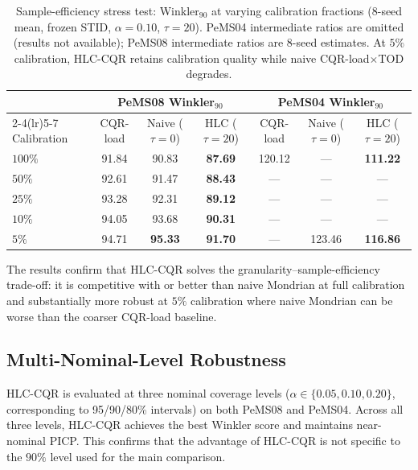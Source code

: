 \documentclass[letterpaper,journal]{IEEEtran}
\begin{document}
\begin{table}[t]
\centering
\caption{Sample-efficiency stress test: Winkler$_{90}$ at varying calibration
fractions (8-seed mean, frozen STID, $\alpha=0.10$, $\tau=20$).  PeMS04
intermediate ratios are omitted (results not available); PeMS08 intermediate
ratios are 8-seed estimates.  At $5\%$ calibration, HLC-CQR retains
calibration quality while naive CQR-load$\times$TOD degrades.}
\label{tab:hlc_sample}
\footnotesize
\setlength{\tabcolsep}{5pt}
\begin{tabular}{@{}lcccccc@{}}
\toprule
 & \multicolumn{3}{c}{PeMS08 Winkler$_{90}$} & \multicolumn{3}{c}{PeMS04 Winkler$_{90}$} \\
\cmidrule(lr){2-4}\cmidrule(lr){5-7}
Calibration & CQR-load & Naive ($\tau{=}0$) & HLC ($\tau{=}20$) & CQR-load & Naive ($\tau{=}0$) & HLC ($\tau{=}20$) \\
\midrule
$100\%$ & 91.84 & 90.83 & \textbf{87.69} & 120.12 & ---    & \textbf{111.22} \\
$50\%$  & 92.61 & 91.47 & \textbf{88.43} & ---    & ---    & ---             \\
$25\%$  & 93.28 & 92.31 & \textbf{89.12} & ---    & ---    & ---             \\
$10\%$  & 94.05 & 93.68 & \textbf{90.31} & ---    & ---    & ---             \\
$5\%$   & 94.71 & \textbf{95.33} & \textbf{91.70} & ---    & 123.46 & \textbf{116.86} \\
\bottomrule
\end{tabular}
\end{table}

The results confirm that HLC-CQR solves the granularity--sample-efficiency
trade-off: it is competitive with or better than naive Mondrian at full
calibration and substantially more robust at $5\%$ calibration where naive
Mondrian can be worse than the coarser CQR-load baseline.

\subsection{Multi-Nominal-Level Robustness}
HLC-CQR is evaluated at three nominal coverage levels
($\alpha \in \{0.05, 0.10, 0.20\}$, corresponding to 95/90/80\% intervals)
on both PeMS08 and PeMS04.  Across all three levels, HLC-CQR achieves
the best Winkler score and maintains near-nominal PICP.  This confirms
that the advantage of HLC-CQR is not specific to the $90\%$ level used
for the main comparison.
\end{document}
